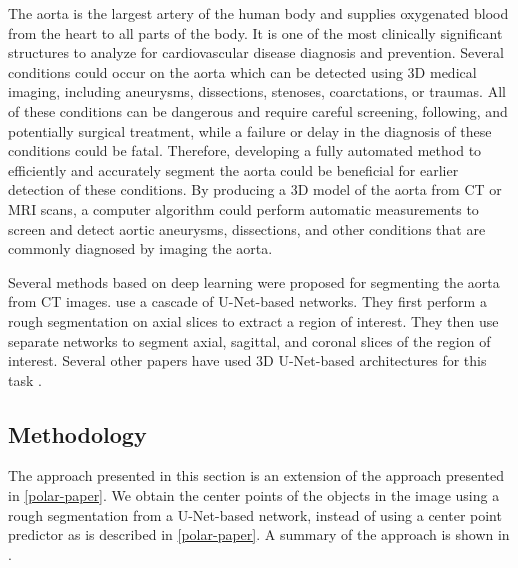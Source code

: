 The aorta is the largest artery of the human body and supplies oxygenated blood from the heart to all parts of the body. It is one of the most clinically significant structures to analyze for cardiovascular disease diagnosis and prevention. Several conditions could occur on the aorta which can be detected using 3D medical imaging, including aneurysms, dissections, stenoses, coarctations, or traumas. All of these conditions can be dangerous and require careful screening, following, and potentially surgical treatment, while a failure or delay in the diagnosis of these conditions could be fatal. Therefore, developing a fully automated method to efficiently and accurately segment the aorta could be beneficial for earlier detection of these conditions. By producing a 3D model of the aorta from CT or MRI scans, a computer algorithm could perform automatic measurements to screen and detect aortic aneurysms, dissections, and other conditions that are commonly diagnosed by imaging the aorta.

Several methods based on deep learning were proposed for segmenting the aorta from CT images. \citet{fantazzini3DAutomaticSegmentation2020} use a cascade of U-Net-based networks. They first perform a rough segmentation on axial slices to extract a region of interest. They then use separate networks to segment axial, sagittal, and coronal slices of the region of interest. Several other papers have used 3D U-Net-based architectures for this task \cite{yuThreeDimensionalDeepConvolutional2021, chenMultistageLearningSegmentation2021}.

\subsection{Methodology}

The approach presented in this section is an extension of the approach presented in \ref{polar-paper}. We obtain the center points of the objects in the image using a rough segmentation from a U-Net-based network, instead of using a center point predictor as is described in \ref{polar-paper}. A summary of the approach is shown in .

